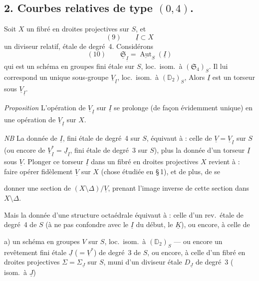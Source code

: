 \documentclass[11pt,a4paper]{article}
\begin{document}
\subsection{2. Courbes relatives de type $(0,4)$.}

Soit $X$ un fibré en droites projectives sur $S$, et
\[
  (9) \qquad \underline{I} \subset X
\]
un diviseur relatif, étale de degré~4. Considérons
\[
  (10) \qquad \underline{\mathfrak{S}}_{\underline{I}} = \underline{\operatorname{Aut}}_S(\underline{I})
\]
qui est un schéma en groupes fini étale sur $S$, loc.\ isom.\ à
$(\mathfrak{S}_4)_S$. Il lui correspond un unique sous-groupe 
$\underline{V}_{\underline{I}}$, loc.\ isom.\ à $(\mathbb{D}_2)_S$,
 Alors $\underline{I}$ est un torseur sous
$\underline{V}_{\underline{I}}$.

\emph{Proposition} L'opération de $\underline{V}_{\underline{I}}$ sur
$\underline{I}$ se prolonge (de façon évidemment unique) en une opération de
$\underline{V}_{\underline{I}}$ sur $X$.

\emph{NB} La donnée de $\underline{I}$, fini étale de degré~4 sur $S$,
équivaut à : celle de $\underline{V} = \underline{V}_{\underline{I}}$ sur $S$
(ou encore de $\underline{V}^{*}_{\underline{I}} = \underline{J}_{\underline{I}}$,
fini étale de degré~3 sur $S$), plus la donnée d'un torseur $\underline{I}$ sous
$\underline{V}$. Plonger ce torseur $\underline{I}$ dans un fibré en droites
projectives $X$ revient à : faire opérer fidèlement $\underline{V}$ sur $X$
(chose étudiée en §\,1), et de plus, de se

donner une section de $(X \setminus \Delta)/\underline{V}$, \ill{} prenant
 l'image inverse de cette section dans
$X \setminus \Delta$.

Mais la donnée d'une structure octaédrale équivaut à : celle d'un
\struck{\ill{}} rev.\ étale de degré~4 de $S$ (à ne pas confondre avec le
$\underline{I}$ du début,  le $\underline{K}$), ou encore,
à celle de

a) un schéma en groupes $V$ sur $S$, loc.\ isom.\ à $(\mathbb{D}_2)_S$ --- ou
encore un revêtement fini étale $\underline{J}$ ($= \underline{V}^*$) de degré~3
de $S$, ou encore, à celle d'un \struck{\ill{}} fibré en droites projectives
$\Sigma = \Sigma_{\underline{J}}$ sur $S$, muni d'un diviseur 
étale $D_{\underline{J}}$ de degré~3 (\ill{} isom.\ à $\underline{J}$)
\end{document}
